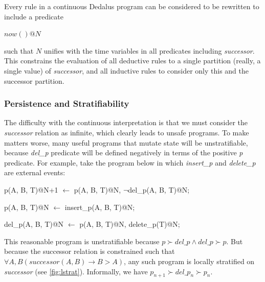 Every rule in a continuous Dedalus program can be considered to be rewritten to include a predicate

$now()@N$

such that $N$ unifies with the time variables in all predicates including \emph{successor}.  This constrains the evaluation of all deductive 
rules to a single partition (really, a single value) of \emph{successor}, and all inductive rules to consider only this and the successor partition.

\subsubsection{Persistence and Stratifiability}


The difficulty with the continuous interpretation is that we must consider the \emph{successor} relation as infinite, which clearly leads
to unsafe programs.  To make matters worse, many useful programs that mutate state will be unstratifiable, because \emph{del\_p} predicate
will be defined negatively in terms of the positive \emph{p} predicate.  For example, take the program below in which \emph{insert\_p}
and \emph{delete\_p} are external events:

\begin{Dedalus}
p(A, B, T)@N+1 \(\leftarrow\)
  p(A, B, T)@N,
  \(\lnot\)del\_p(A, B, T)@N;
  
  
p(A, B, T)@N \(\leftarrow\)
  insert\_p(A, B, T)@N;
  
del_p(A, B, T)@N \(\leftarrow\)
  p(A, B, T)@N,
  delete\_p(T)@N;
\end{Dedalus}

This reasonable program is unstratifiable because $p \succ del\_p \land del\_p \succ p$.  But because the successor relation is constrained
such that $\forall A,B (successor(A, B) \rightarrow B > A)$, any such program is locally stratified on \emph{successor} (see \ref{fig:lstrat}).  Informally,
we have $p_{n+1} \succ del\_p_{n} \succ p_{n}$.



